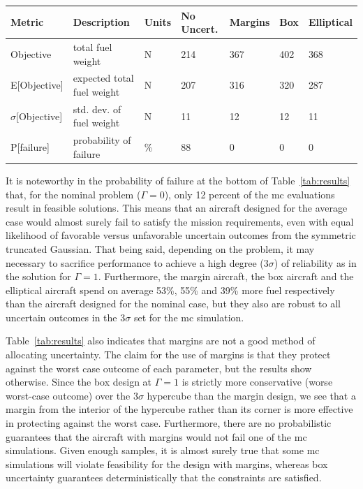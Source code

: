 \begin{table}[!h]
\begin{center}
\begin{tabular}{C{2cm} C{3.8cm} C{1.25cm} C{1.6cm} C{1.6cm} C{1.6cm} C{1.6cm}}
\hline
Metric & Description & Units & No Uncert. & Margins & Box & Elliptical \\
\hline
Objective & total fuel weight & $\mathrm{N}$ & 214 & 367 & 402 & 368 \\
E[Objective] & expected total fuel weight & $\mathrm{N}$ & 207 & 316 & 320 & 287 \\
$\sigma$[Objective] & std. dev. of fuel weight & $\mathrm{N}$ & 11 & 12 & 12 & 11 \\
P[failure] & probability of failure & \% & 88 & 0 & 0 & 0\\
\hline
\end{tabular}
\end{center}
\end{table}

It is noteworthy in the probability of failure at the bottom of Table~\ref{tab:results} that,
for the nominal problem ($\Gamma = 0$),
only 12 percent of the \gls{mc} evaluations result in feasible solutions.
This means that an aircraft designed for the average case would almost surely
fail to satisfy the mission requirements, even with equal likelihood of favorable versus
unfavorable uncertain outcomes from the symmetric truncated Gaussian.
That being said, depending on the problem, it may necessary to sacrifice
performance to achieve a high degree ($3\sigma$) of
reliability as in the solution for $\Gamma = 1$. Furthermore, the margin aircraft, the box aircraft
and the elliptical aircraft spend on average 53\%, 55\% and 39\% more fuel respectively
than the aircraft designed for the nominal case, but they also are
robust to all uncertain outcomes in the $3\sigma$ set for the \gls{mc} simulation.

Table~\ref{tab:results} also indicates that margins are not a good method of
allocating uncertainty. The claim for the use of margins is that they protect against
the worst case outcome of each parameter, but the results show otherwise.
Since the box design at $\Gamma=1$ is strictly
more conservative (worse worst-case outcome) over the $3\sigma$ hypercube
than the margin design, we see that a margin from the interior of the hypercube
rather than its corner is more effective in protecting against the worst case.
Furthermore, there are no probabilistic
guarantees that the aircraft
with margins would not fail one of the \gls{mc} simulations. Given enough samples,
it is almost surely true that some \gls{mc} simulations will violate feasibility
for the design with margins,
whereas box uncertainty guarantees deterministically that the constraints are satisfied.

